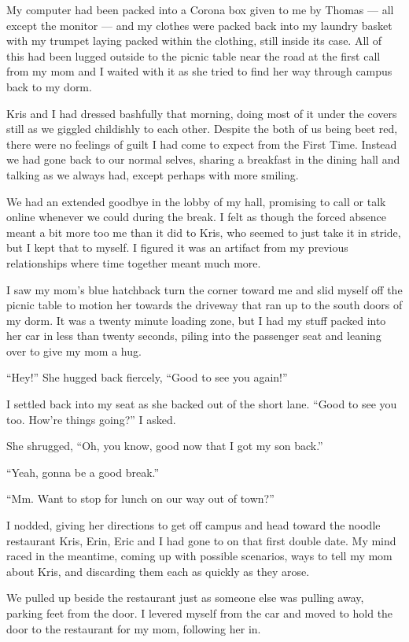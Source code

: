 My computer had been packed into a Corona box given to me by Thomas --- all except the monitor --- and my clothes were packed back into my laundry basket with my trumpet laying packed within the clothing, still inside its case.  All of this had been lugged outside to the picnic table near the road at the first call from my mom and I waited with it as she tried to find her way through campus back to my dorm.

Kris and I had dressed bashfully that morning, doing most of it under the covers still as we giggled childishly to each other.  Despite the both of us being beet red, there were no feelings of guilt I had come to expect from the First Time.  Instead we had gone back to our normal selves, sharing a breakfast in the dining hall and talking as we always had, except perhaps with more smiling.

We had an extended goodbye in the lobby of my hall, promising to call or talk online whenever we could during the break.  I felt as though the forced absence meant a bit more too me than it did to Kris, who seemed to just take it in stride, but I kept that to myself.  I figured it was an artifact from my previous relationships where time together meant much more.

I saw my mom's blue hatchback turn the corner toward me and slid myself off the picnic table to motion her towards the driveway that ran up to the south doors of my dorm.  It was a twenty minute loading zone, but I had my stuff packed into her car in less than twenty seconds, piling into the passenger seat and leaning over to give my mom a hug.

``Hey!''  She hugged back fiercely, ``Good to see you again!''

I settled back into my seat as she backed out of the short lane.  ``Good to see you too.  How're things going?'' I asked.

She shrugged, ``Oh, you know, good now that I got my son back.''

``Yeah, gonna be a good break.''

``Mm.  Want to stop for lunch on our way out of town?''

I nodded, giving her directions to get off campus and head toward the noodle restaurant Kris, Erin, Eric and I had gone to on that first double date.  My mind raced in the meantime, coming up with possible scenarios, ways to tell my mom about Kris, and discarding them each as quickly as they arose.

We pulled up beside the restaurant just as someone else was pulling away, parking feet from the door.  I levered myself from the car and moved to hold the door to the restaurant for my mom, following her in.

